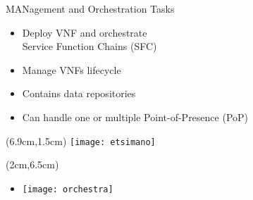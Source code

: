\begin{frame}{MANagement and Orchestration}
  Tasks
  \begin{itemize}
  \item<1-> Deploy VNF and orchestrate\\ Service Function Chains (SFC)
  \item<2-> Manage VNFs lifecycle
  \item<3-> Contains data repositories
  \item<4-> Can handle one or multiple Point-of-Presence (PoP)
  \end{itemize}

  \begin{textblock*}{5cm}(6.9cm,1.5cm)
    \texttt{[image: etsimano]}
  \end{textblock*}

  \begin{textblock*}{5cm}(2cm,6.5cm)
    \begin{itemize}
    \item[] \texttt{[image: orchestra]}
    \end{itemize}
  \end{textblock*}
\end{frame}
